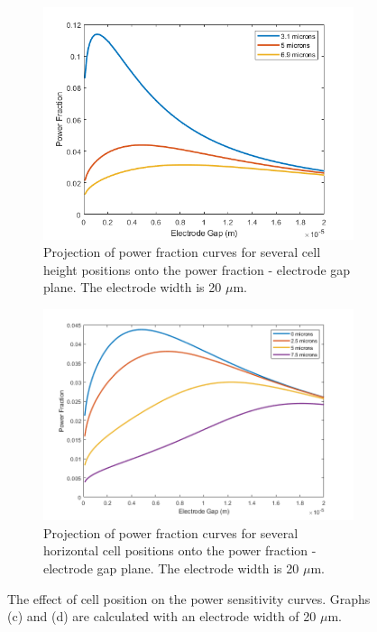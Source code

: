 \begin{figure}[h]
\begin{subfigure}[b]{0.49\textwidth}
        \label{fig:horizontal_cell_position_sensitivty}
    \end{subfigure}
    \\
    \vspace{0.1 in}
    \begin{subfigure}[b]{0.49\textwidth}
        \centering
        \includegraphics[width=\textwidth]{images/analytic_vertical_power_width20.png}
        \caption{Projection of power fraction curves for several cell height positions onto the power fraction - electrode gap plane. The electrode width is 20 $\mu$m.}
    \end{subfigure}
    \hfill
    \begin{subfigure}[b]{0.49\textwidth}
        \centering
        \includegraphics[width=\textwidth]{images/analytic_horizontal_power_20width.png}
        \caption{Projection of power fraction curves for several horizontal cell positions onto the power fraction - electrode gap plane. The electrode width is 20 $\mu$m.}
    \end{subfigure}
    \caption[power comp]{The effect of cell position on the power sensitivity curves. Graphs (c) and (d) are calculated with an electrode width of 20 $\mu$m.}
    \label{fig:cell_position_sensitivity}
\end{figure}

